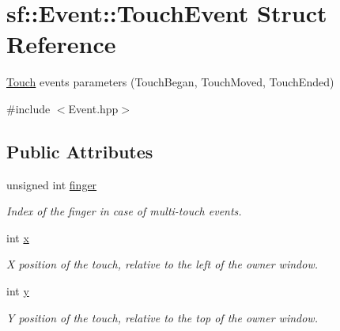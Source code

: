 \hypertarget{structsf_1_1_event_1_1_touch_event}{}\section{sf\+:\+:Event\+:\+:Touch\+Event Struct Reference}
\label{structsf_1_1_event_1_1_touch_event}


\hyperlink{classsf_1_1_touch}{Touch} events parameters (Touch\+Began, Touch\+Moved, Touch\+Ended)  




{\ttfamily \#include $<$Event.\+hpp$>$}

\subsection*{Public Attributes}
\begin{DoxyCompactItemize}
\item 
\mbox{\label{structsf_1_1_event_1_1_touch_event_a9a79fe86bf9ac3c16ec7326f96feb61a}} 
unsigned int \hyperlink{structsf_1_1_event_1_1_touch_event_a9a79fe86bf9ac3c16ec7326f96feb61a}{finger}
\begin{DoxyCompactList}\small\item\em Index of the finger in case of multi-\/touch events. \end{DoxyCompactList}\item 
\mbox{\label{structsf_1_1_event_1_1_touch_event_a8993963790b850caa68b98d3cad2be45}} 
int \hyperlink{structsf_1_1_event_1_1_touch_event_a8993963790b850caa68b98d3cad2be45}{x}
\begin{DoxyCompactList}\small\item\em X position of the touch, relative to the left of the owner window. \end{DoxyCompactList}\item 
\mbox{\label{structsf_1_1_event_1_1_touch_event_add80639dc68bc37e3275744d501cdbe0}} 
int \hyperlink{structsf_1_1_event_1_1_touch_event_add80639dc68bc37e3275744d501cdbe0}{y}
\begin{DoxyCompactList}\small\item\em Y position of the touch, relative to the top of the owner window. \end{DoxyCompactList}\end{DoxyCompactItemize}


